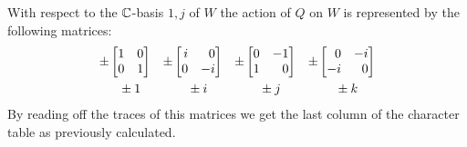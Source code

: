 \begin{example}
  With respect to the $\mathbb{C}$-basis $1, j$ of $W$ the action of $Q$ on $W$ is represented by the following matrices:
  \[
    \begin{array}{ccccc}
        \pm
        \begin{bmatrix*}[r]
          1 & 0 \\
          0 & 1
        \end{bmatrix*}
      & \pm
        \begin{bmatrix*}[r]
          i &  0  \\
          0 & -i
        \end{bmatrix*}
      & \pm
        \begin{bmatrix*}[r]
          0 & -1  \\
          1 &  0
        \end{bmatrix*}
      & \pm
        \begin{bmatrix*}[r]
           0  & -i \\
          -i  &  0
        \end{bmatrix*}
      \\
        \rule{0pt}{1.2em}
        \phantom{\pm}\pm 1
      & \phantom{\pm}\pm i
      & \phantom{\pm}\pm j
      & \phantom{\pm}\pm k
    \end{array}
  \]
  By reading off the traces of this matrices we get the last column of the character table as previously calculated.
\end{example}




